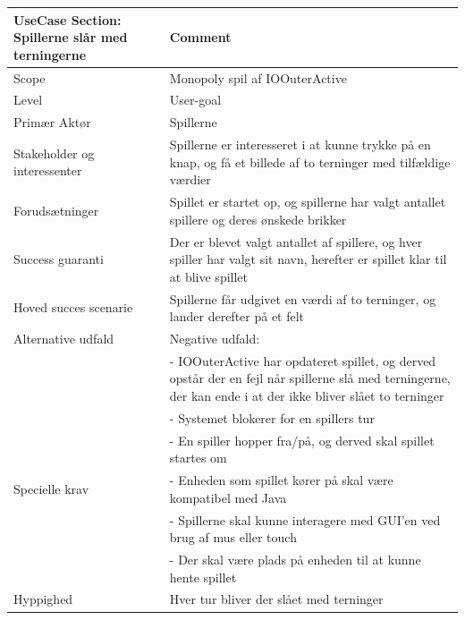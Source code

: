 \begin{center}
\begin{tabular}{ | m{10em} | m{10cm}| }
        \hline
            UseCase Section: Spillerne slår med terningerne & Comment\\
        \hline
            Scope & Monopoly spil af IOOuterActive\\
        \hline
            Level & User-goal\\
        \hline
            Primær Aktør & Spillerne\\
        \hline
            Stakeholder og interessenter & Spillerne er interesseret i at kunne trykke på en knap, og få et billede af to terninger med tilfældige værdier\\
        \hline
            Forudsætninger & Spillet er startet op, og spillerne har valgt antallet spillere og deres ønskede brikker\\
        \hline
            Success guaranti & Der er blevet valgt antallet af spillere, og hver spiller har valgt sit navn, herefter er spillet klar til at blive spillet\\
        \hline
            Hoved succes scenarie & Spillerne får udgivet en værdi af to terninger, og lander derefter på et felt\\
        \hline
            Alternative udfald & Negative udfald:\\
                & -	IOOuterActive har opdateret spillet, og derved opstår der en fejl når spillerne slå med terningerne, der kan ende i at der ikke bliver slået to terninger\\
                & -	Systemet blokerer for en spillers tur\\
                & -	En spiller hopper fra/på, og derved skal spillet startes om\\
        \hline
            Specielle krav
            & -	Enheden som spillet kører på skal være kompatibel med Java\\
            & -	Spillerne skal kunne interagere med GUI’en ved brug af mus eller touch\\
            & -	Der skal være plads på enheden til at kunne hente spillet\\
        \hline
            Hyppighed & Hver tur bliver der slået med terninger\\
        \hline
    \end{tabular}
\end{center}

